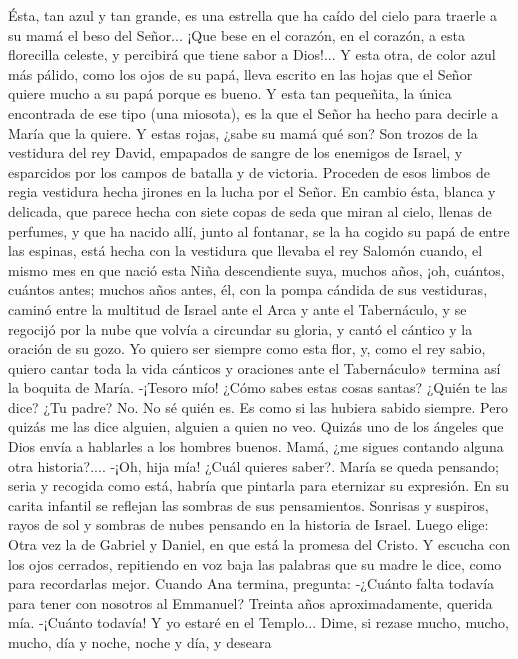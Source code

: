 \documentclass[12pt]{book} %
\begin{document}
Ésta, tan azul y tan grande, es una estrella que ha caído del cielo para traerle a su mamá el beso del Señor... ¡Que bese 
en el corazón, en el corazón, a esta florecilla celeste, y percibirá que tiene sabor a Dios!... 
Y esta otra, de color azul más pálido, como los ojos de su papá, lleva escrito en las hojas que el Señor quiere mucho a su papá porque es bueno. 
Y esta tan pequeñita, la única encontrada de ese tipo (una miosota), es la que el Señor ha hecho para decirle a María 
que la quiere. 
Y estas rojas, ¿sabe su mamá qué son? Son trozos de la vestidura del rey David, empapados de sangre de los enemigos 
de Israel, y esparcidos por los campos de batalla y de victoria. Proceden de esos limbos de regia vestidura hecha jirones en la lucha por el Señor. 
En cambio ésta, blanca y delicada, que parece hecha con siete copas de seda que miran al cielo, llenas de perfumes, y 
que ha nacido allí, junto al fontanar, se la ha cogido su papá de entre las espinas, está hecha con la vestidura que llevaba el rey Salomón cuando, el mismo mes en que nació esta Niña descendiente suya, muchos años, ¡oh, cuántos, cuántos antes; muchos años antes, él, con la pompa cándida de sus vestiduras, caminó entre la multitud de Israel ante el Arca y ante el Tabernáculo, y se regocijó por la nube que volvía a circundar su gloria, y cantó el cántico y la oración de su gozo. 
Yo quiero ser siempre como esta flor, y, como el rey sabio, quiero cantar toda la vida cánticos y oraciones ante el Tabernáculo» termina así la boquita de María. 
-¡Tesoro mío! ¿Cómo sabes estas cosas santas? ¿Quién te las dice? ¿Tu padre? 
No. No sé quién es. Es como si las hubiera sabido siempre. Pero quizás me las dice alguien, alguien a quien no veo. Quizás uno de los ángeles que Dios envía a hablarles a los hombres buenos. Mamá, ¿me sigues contando alguna otra historia?.... 
-¡Oh, hija mía! ¿Cuál quieres saber?. 
María se queda pensando; seria y recogida como está, habría que pintarla para eternizar su expresión. En su carita infantil se reflejan las sombras de sus pensamientos. Sonrisas y suspiros, rayos de sol y sombras de nubes pensando en la historia de Israel. Luego elige: 
Otra vez la de Gabriel y Daniel, en que está la promesa del Cristo. 
Y escucha con los ojos cerrados, repitiendo en voz baja las palabras que su madre le dice, como para recordarlas mejor. Cuando Ana termina, pregunta: 
-¿Cuánto falta todavía para tener con nosotros al Emmanuel? 
Treinta años aproximadamente, querida mía. 
-¡Cuánto todavía! Y yo estaré en el Templo... Dime, si rezase mucho, mucho, mucho, día y noche, noche y día, y deseara 
\end{document}
